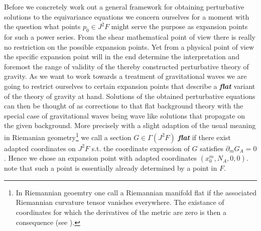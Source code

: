 \documentclass[a4paper,12pt, DIV=14, BCOR=5mm, twoside, headsepline, numbers=noenddot]{scrbook}
\begin{document}
Before we concretely work out a general framework for obtaining perturbative solutions to the equivariance equations we concern ourselves for a moment with the question what points $p_0 \in J^2F$ might serve the purpose as expansion points for such a power series. From the shear mathematical point of view there is really no restriction on the possible expansion points. Yet from a physical point of view the specific expansion point will in the end determine the interpretation and foremost the range of validity of the thereby constructed perturbative theory of gravity. As we want to work towards a treatment of gravitational waves we are going to restrict ourselves to certain expansion points that describe a \textit{\textbf{flat}} variant of the theory of gravity at hand. Solutions of the obtained perturbative equations can then be thought of as corrections to that flat background theory with the special case of gravitational waves being wave like solutions that propagate on the given background. More precisely with a slight adaption of the usual meaning in Riemanian geometry\footnote{In Riemannian geoemtry one call a Riemannian manifold flat if the associated Riemannian curvature tensor vanishes everywhere. The existance of coordinates for which the derivatives of the metric are zero is then a consequence (see \cite{petersen2006riemannian}).} we call a section $G \in \Gamma(J^2F)$ \textit{\textbf{flat}} if there exist adapted coordinates on $J^2F$ s.t. the coordinate expression of $G$ satisfies $\partial_mG_{A}=0$.
Hence we chose an expansion point with adapted coordinates $(x_0^m,N_A,0,0)$. note that such a point is essentially already determined by a point in $F$. 
\end{document}
